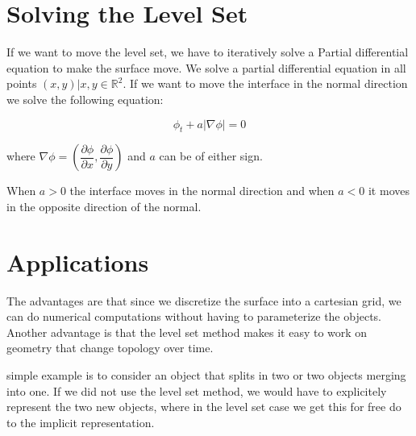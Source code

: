
\section*{Solving the Level Set}\label{sec:intro:solve} 


If we want to move the level set, we have to iteratively solve a
Partial differential equation to make the surface move. We solve a
partial differential equation in all points $(x,y) | x,y \in
\mathbb{R}^{2}$. If we want to move the interface in the normal
direction we solve the following equation:

\begin{equation}
\phi_{t} + a|\nabla \phi| = 0
\end{equation}\label{eq:normMove}

where $\nabla \phi = \left(\dfrac{\partial \phi}{\partial x},
\dfrac{\partial \phi}{\partial y}\right)$ and $a$ can be of either sign.

When $a > 0$ the interface moves in the normal direction and when $a <
0$ it moves in the opposite direction of the normal.

\section*{Applications}

The advantages are that since we discretize the surface into a
cartesian grid, we can do numerical computations without having to
parameterize the objects. Another advantage is that the level set
method makes it easy to work on geometry that change topology over
time.


simple example is to consider an object that splits in two or two
objects merging into one. If we did not use the level set method, we
would have to explicitely represent the two new objects, where in the
level set case we get this for free do to the implicit representation.





